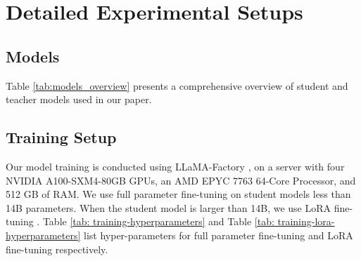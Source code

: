 \section{Detailed Experimental Setups}
\label{appendix:More on Experimental Setups}






\subsection{Models}
Table \ref{tab:models_overview} presents a comprehensive overview of student and teacher models used in our paper. 




\subsection{Training Setup}
\label{appx:training-setup}
Our model training is conducted using LLaMA-Factory \citep{zheng2024llamafactory}, on a server with four NVIDIA A100-SXM4-80GB GPUs, an AMD EPYC 7763 64-Core Processor, and 512 GB of RAM. We use full parameter fine-tuning on student models less than 14B parameters. 
When the student model is larger than 14B, we use LoRA fine-tuning \cite{hu2021loralowrankadaptationlarge}. 
Table \ref{tab: training-hyperparameters} and Table \ref{tab: training-lora-hyperparameters} list hyper-parameters for full parameter fine-tuning and LoRA fine-tuning respectively. 


\begin{table}[!h]
\small
\centering
{}
\caption{This table shows the hyper-parameters for full parameter fine-tuning.}
\label{tab: training-hyperparameters}
\end{table}



